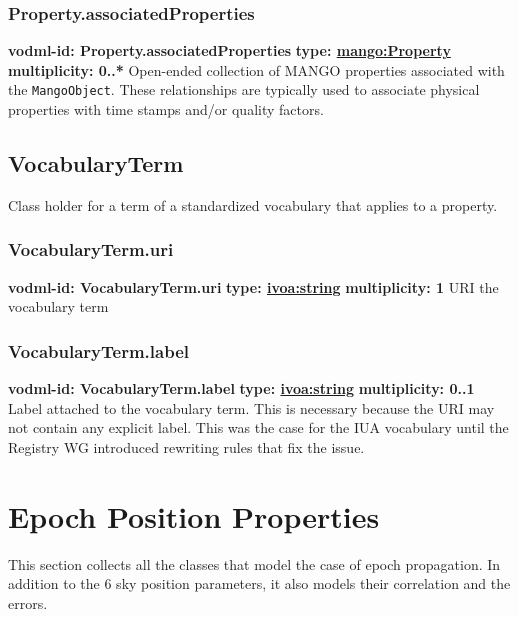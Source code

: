     \subsubsection{Property.associatedProperties}
    \textbf{vodml-id: Property.associatedProperties} \newline
    \textbf{type: \hyperref[sect:Property]{mango:Property}} \newline
    \textbf{multiplicity: 0..*} \newline
    Open-ended collection of MANGO properties associated with the \texttt{MangoObject}. These relationships are typically used to associate physical properties with time stamps and/or quality factors.

  \subsection{VocabularyTerm}
    \label{sect:VocabularyTerm}
    Class holder for a term of a standardized vocabulary that applies to a property.

    \subsubsection{VocabularyTerm.uri}
    \textbf{vodml-id: VocabularyTerm.uri} \newline
    \textbf{type: \hyperref[sect:ivoa]{ivoa:string}} \newline
    \textbf{multiplicity: 1} \newline
    URI the vocabulary term

    \subsubsection{VocabularyTerm.label}
    \textbf{vodml-id: VocabularyTerm.label} \newline
    \textbf{type: \hyperref[sect:ivoa]{ivoa:string}} \newline
    \textbf{multiplicity: 0..1} \newline
    Label attached to the vocabulary term. This is necessary because the URI may not contain any explicit label. This was the case for the IUA vocabulary until the Registry WG introduced rewriting rules that fix the issue.

\section{Epoch Position Properties}
This section collects all the classes that model the case of epoch propagation. 
In addition to the 6 sky position parameters, it also models their correlation and the errors.
